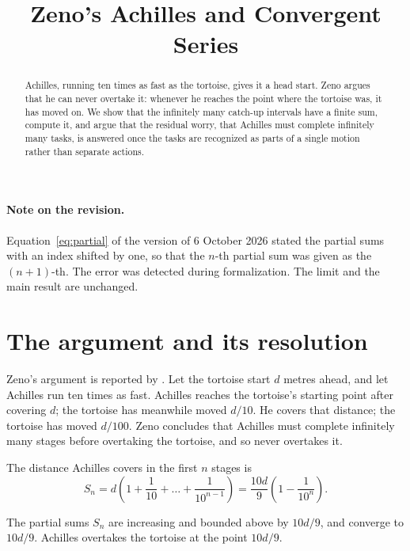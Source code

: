 \documentclass{situationist-preprint}
\title{Zeno's Achilles and Convergent Series}
\begin{document}
\maketitle

\begin{abstract}
Achilles, running ten times as fast as the tortoise, gives it a head start. Zeno argues that he can never overtake it: whenever he reaches the point where the tortoise was, it has moved on. We show that the infinitely many catch-up intervals have a finite sum, compute it, and argue that the residual worry, that Achilles must complete infinitely many tasks, is answered once the tasks are recognized as parts of a single motion rather than separate actions.
\end{abstract}

\paragraph{Note on the revision.} Equation~\eqref{eq:partial} of the version of 6 October 2026 stated the partial sums with an index shifted by one, so that the $n$-th partial sum was given as the $(n+1)$-th. The error was detected during formalization. The limit and the main result are unchanged.

\section{The argument and its resolution}

Zeno's argument is reported by \citet[VI.9, 239b14--18]{Aristotle}. Let the tortoise start $d$ metres ahead, and let Achilles run ten times as fast. Achilles reaches the tortoise's starting point after covering $d$; the tortoise has meanwhile moved $d/10$. He covers that distance; the tortoise has moved $d/100$. Zeno concludes that Achilles must complete infinitely many stages before overtaking the tortoise, and so never overtakes it.

The distance Achilles covers in the first $n$ stages is
\begin{equation}\label{eq:partial}
S_n = d\left(1 + \frac{1}{10} + \dots + \frac{1}{10^{n-1}}\right) = \frac{10d}{9}\left(1 - \frac{1}{10^{n}}\right).
\end{equation}

\begin{theorem}\label{t:main}
The partial sums $S_n$ are increasing and bounded above by $10d/9$, and converge to $10d/9$. Achilles overtakes the tortoise at the point $10d/9$.
\end{theorem}
\end{document}
